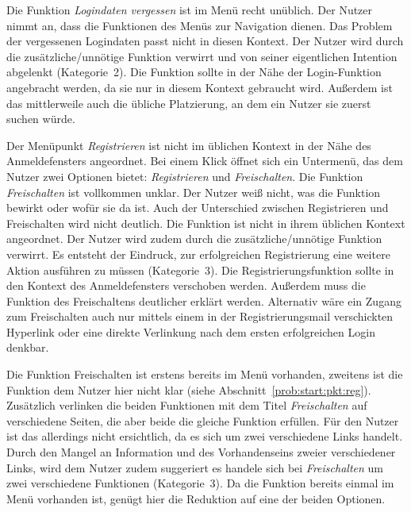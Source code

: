 {Die Funktion \emph{Logindaten vergessen} ist im Menü recht unüblich. Der Nutzer nimmt an, dass die Funktionen des Menüs zur Navigation dienen. Das Problem der vergessenen Logindaten passt nicht in diesen Kontext.
}
{Der Nutzer wird durch die zusätzliche/unnötige Funktion verwirrt und von seiner eigentlichen Intention abgelenkt (Kategorie~2).
}
{Die Funktion sollte in der Nähe der Login-Funktion angebracht werden, da sie nur in diesem Kontext gebraucht wird. Außerdem ist das mittlerweile auch die übliche Platzierung, an dem ein Nutzer sie zuerst suchen würde.
}\label{prob:start:pkt:login}

{Der Menüpunkt \emph{Registrieren} ist nicht im üblichen Kontext in der Nähe des Anmeldefensters angeordnet. Bei einem Klick öffnet sich ein Untermenü, das dem Nutzer zwei Optionen bietet: \emph{Registrieren} und \emph{Freischalten}.
Die Funktion \emph{Freischalten} ist vollkommen unklar. Der Nutzer weiß nicht, was die Funktion bewirkt oder wofür sie da ist. Auch der Unterschied zwischen Registrieren und Freischalten wird nicht deutlich.
}{Die Funktion ist nicht in ihrem üblichen Kontext angeordnet. Der Nutzer wird zudem durch die zusätzliche/unnötige Funktion verwirrt. Es entsteht der Eindruck, zur erfolgreichen Registrierung eine weitere Aktion ausführen zu müssen (Kategorie~3).}
{Die Registrierungsfunktion sollte in den Kontext des Anmeldefensters verschoben werden. Außerdem muss die Funktion des Freischaltens deutlicher erklärt werden. Alternativ wäre ein Zugang zum Freischalten auch nur mittels einem in der Registrierungsmail verschickten Hyperlink oder eine direkte Verlinkung nach dem ersten erfolgreichen Login denkbar.
}\label{prob:start:pkt:reg}

{Die Funktion Freischalten ist erstens bereits im Menü vorhanden, zweitens ist die Funktion dem Nutzer hier nicht klar (siehe Abschnitt~\ref{prob:start:pkt:reg}). 
Zusätzlich verlinken die beiden Funktionen mit dem Titel \emph{Freischalten} auf verschiedene Seiten, die aber beide die gleiche Funktion erfüllen. Für den Nutzer ist das allerdings nicht ersichtlich, da es sich um zwei verschiedene Links handelt.
}
{Durch den Mangel an Information und des Vorhandenseins zweier verschiedener Links, wird dem Nutzer zudem suggeriert es handele sich bei \emph{Freischalten} um zwei verschiedene Funktionen (Kategorie~3).
}
{
Da die Funktion bereits einmal im Menü vorhanden ist, genügt hier die Reduktion auf eine der beiden Optionen.
}\label{prob:start:pkt:frei}

